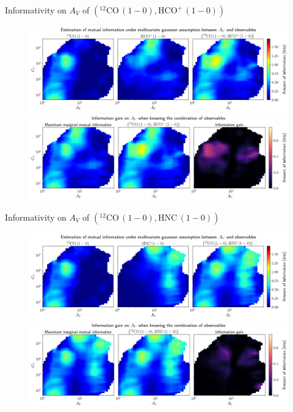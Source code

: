 \documentclass{beamer}
\begin{document}
\begin{frame}{Informativity on $A_V$ of $\left(\mathrm{^{12}CO\,(1-0)},\mathrm{HCO^+\,(1-0)}\right)$}
    \begin{figure}
        \centering
        \includegraphics[width=0.95\linewidth]{../linearinfo/av__12co10_hcop10_linearinfo.png}
        \vfill
        \includegraphics[width=0.95\linewidth]{../linearinfo/av__12co10_hcop10_linearinfo_gain.png}
    \end{figure}
\end{frame}

\begin{frame}{Informativity on $A_V$ of $\left(\mathrm{^{12}CO\,(1-0)},\mathrm{HNC\,(1-0)}\right)$}
    \begin{figure}
        \centering
        \includegraphics[width=0.95\linewidth]{../linearinfo/av__12co10_hnc10_linearinfo.png}
        \vfill
        \includegraphics[width=0.95\linewidth]{../linearinfo/av__12co10_hnc10_linearinfo_gain.png}
    \end{figure}
\end{frame}
\end{document}
